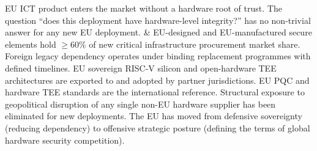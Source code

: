 \begin{landscape}
\begin{longtable}
EU ICT product enters the market without a hardware root of trust.
The question ``does this deployment have hardware-level integrity?''
has no non-trivial answer for any new EU deployment.
&
EU-designed and EU-manufactured secure elements hold $\geq$60\% of new
critical infrastructure procurement market share. Foreign legacy
dependency operates under binding replacement programmes with defined
timelines. EU sovereign RISC-V silicon and open-hardware TEE
architectures are exported to and adopted by partner jurisdictions.
EU PQC and hardware TEE standards are the international reference.
Structural exposure to geopolitical disruption of any single non-EU
hardware supplier has been eliminated for new deployments. The EU
has moved from defensive sovereignty (reducing dependency) to offensive
strategic posture (defining the terms of global hardware security
competition).
\\
\hline

\end{longtable}
\end{landscape}



